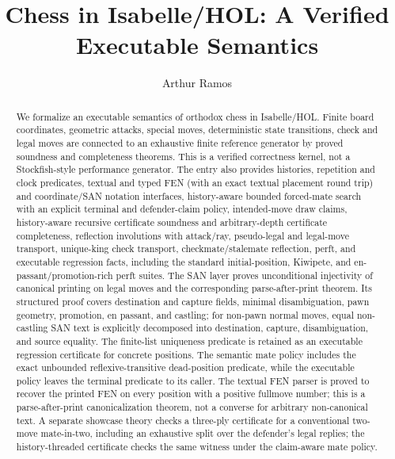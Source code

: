 \documentclass[11pt,a4paper]{article}
\begin{document}
\title{Chess in Isabelle/HOL: A Verified Executable Semantics}
\author{Arthur Ramos}
\maketitle

\begin{abstract}
We formalize an executable semantics of orthodox chess in Isabelle/HOL.
Finite board coordinates, geometric attacks, special moves, deterministic
state transitions, check and legal moves are connected to an exhaustive
finite reference generator by proved soundness and completeness theorems.
This is a verified correctness kernel, not a Stockfish-style performance
generator.  The entry
also provides histories, repetition and clock predicates, textual and typed
FEN (with an exact textual placement round trip) and coordinate/SAN notation
interfaces, history-aware bounded forced-mate search with an explicit terminal
and defender-claim policy, intended-move draw claims,
history-aware recursive certificate soundness and arbitrary-depth certificate
completeness,
reflection involutions with attack/ray, pseudo-legal and legal-move transport,
unique-king check transport, checkmate/stalemate reflection, perft,
and executable regression facts, including the standard initial-position,
Kiwipete, and en-passant/promotion-rich perft suites.  The SAN layer proves
unconditional injectivity of canonical printing on legal moves and the
corresponding parse-after-print theorem.  Its structured proof covers
destination and capture fields, minimal disambiguation, pawn geometry,
promotion, en passant, and castling; for non-pawn normal moves, equal
non-castling SAN text is explicitly decomposed into destination, capture,
disambiguation, and source equality.  The finite-list uniqueness predicate is
retained as an executable regression certificate for concrete positions.  The
semantic mate policy includes the exact unbounded reflexive-transitive
dead-position predicate, while the executable policy leaves the terminal
predicate to its caller.  The textual FEN parser
is proved to recover
the printed FEN on every position with a positive fullmove number; this is a
parse-after-print canonicalization theorem, not a converse for arbitrary
non-canonical text.  A separate showcase theory
checks a three-ply certificate for a conventional two-move mate-in-two,
including an exhaustive split over the defender's legal replies; the
history-threaded certificate checks the same witness under the claim-aware
mate policy.
\end{abstract}
\end{document}
